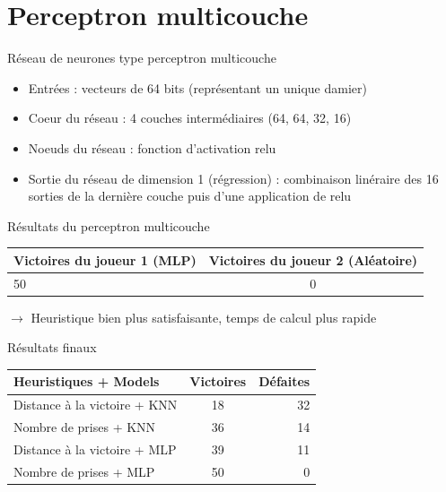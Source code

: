 \documentclass{beamer}
\begin{document}
{\section{Perceptron multicouche}}

\begin{frame}{Réseau de neurones type perceptron multicouche}
    \begin{itemize}
        \item Entrées : vecteurs de 64 bits (représentant un unique damier)
        \item Coeur du réseau : 4 couches intermédiaires (64, 64, 32, 16)
        \item Noeuds du réseau : fonction d'activation \alert{relu}
        \item Sortie du réseau de dimension 1 (régression) : combinaison linéraire des 16 sorties de la dernière couche puis d'une application de \alert{relu}
    \end{itemize}
\end{frame}

\begin{frame} {Résultats du perceptron multicouche}
    \begin{center}
        \begin{tabular}{ | l | c | }
            \hline
            Victoires du joueur 1 (MLP) & Victoires du joueur 2 (Aléatoire) \\ \hline
            50                          & 0                                 \\ \hline
        \end{tabular}
    \end{center}
    $\rightarrow$ Heuristique bien plus satisfaisante, temps de calcul plus rapide
\end{frame}

\begin{frame}{Résultats finaux}
    \begin{center}
        \begin{tabular}{ | l || c | r |}
            \hline 
            Heuristiques + Models & Victoires & Défaites \\
            \hline 
            \hline 
            Distance à la victoire + KNN & 18 & 32 \\
            Nombre de prises + KNN & 36 & 14 \\
            Distance à la victoire + MLP & 39 & 11 \\
            Nombre de prises + MLP & 50 & 0 \\
        \end{tabular}

    \end{center}
\end{frame}
\end{document}
